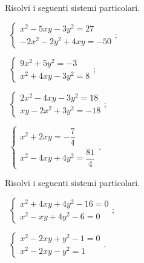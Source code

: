 \begin{esercizio}[\Ast]
\label{ese:6.55}
Risolvi i seguenti sistemi particolari.
\begin{multicols}{2}
 \begin{enumeratea}
 \item~$\left\{\begin{array}{l}x^2-5xy-3y^2=27\\-2x^2-2y^2+4xy=-50\end{array}\right.$;
 \item~$\left\{\begin{array}{l}9x^2+5y^2=-3\\x^2+4xy-3y^2=8\end{array}\right.$;
 \item~$\left\{\begin{array}{l}2x^2-4xy-3y^2=18\\xy-2x^2+3y^2=-18\end{array}\right.$;
 \item~$\left\{\begin{array}{l}x^2+2xy=-\dfrac 7 4\\x^2-4xy+4y^2=\dfrac{81} 4\end{array}\right.$.
 \end{enumeratea}
\end{multicols}
\end{esercizio}

\begin{esercizio}[\Ast]
\label{ese:6.56}
Risolvi i seguenti sistemi particolari.
\begin{multicols}{2}
 \begin{enumeratea}
 \item~$\left\{\begin{array}{l}x^2+4xy+4y^2-16=0\\x^2-xy+4y^2-6=0\end{array}\right.$;
 \item~$\left\{\begin{array}{l}x^2-2xy+y^2-1=0\\x^2-2xy-y^2=1\end{array}\right.$.
 \end{enumeratea}
\end{multicols}
\end{esercizio}

